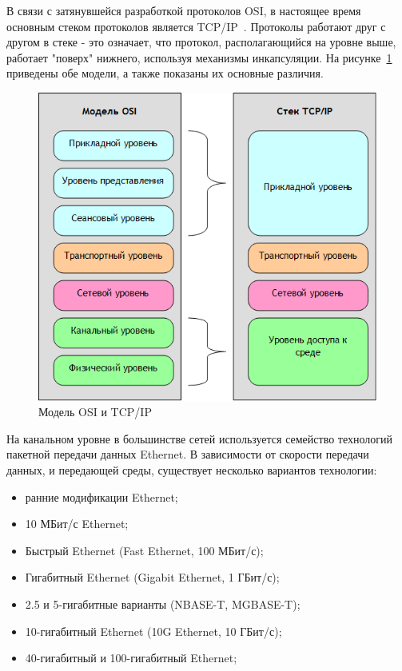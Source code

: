 В связи с затянувшейся разработкой протоколов OSI, в настоящее время основным стеком протоколов является TCP/IP~\cite{modern_net}. Протоколы работают друг с другом в стеке - это означает, что протокол, располагающийся на уровне выше, работает
"поверх" нижнего, используя механизмы инкапсуляции. На рисунке~\ref{pic:model_osi_vs_tcpip} приведены обе модели, а также показаны их основные различия.
\begin{figure}[h]
\centering
\includegraphics[scale=0.5]{pictures/model_osi_vs_tcpip}
\caption{Модель OSI и TCP/IP}
\label{pic:model_osi_vs_tcpip}
\end{figure}

На канальном уровне в большинстве сетей используется семейство технологий пакетной передачи данных Ethernet. В зависимости от скорости передачи данных, и передающей среды, существует несколько вариантов технологии:
\begin{itemize}
\item ранние модификации Ethernet;
\item 10 МБит/с Ethernet;
\item Быстрый Ethernet (Fast Ethernet, 100 МБит/с);
\item Гигабитный Ethernet (Gigabit Ethernet, 1 ГБит/с);
\item 2.5 и 5-гигабитные варианты (NBASE-T, MGBASE-T);
\item 10-гигабитный Ethernet (10G Ethernet, 10 ГБит/с);
\item 40-гигабитный и 100-гигабитный Ethernet;
\end{itemize}

